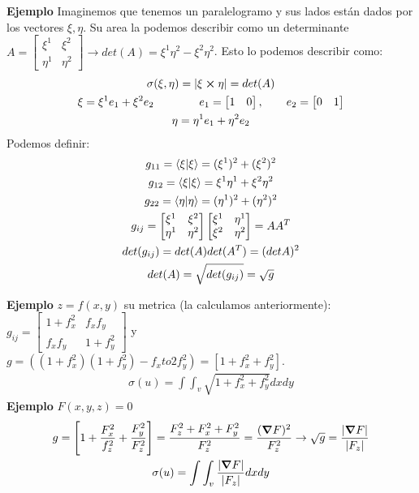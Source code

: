 \documentclass{article}
\begin{document}
\textbf{Ejemplo } Imaginemos que tenemos un paralelogramo y sus lados están dados por los vectores $ \xi, \eta  $. Su area la podemos describir como un determinante $ A = \begin{bmatrix}
    \xi ^ {1 } & \xi ^ {2 } \\
    \eta ^ {1 } & \eta ^ {2 }
\end{bmatrix} \rightarrow det(A) = \xi ^ {1 } \eta ^ {2 } - \xi ^ {2 } \eta ^ {2 }  $. Esto lo podemos describir como: 
\begin{gather}
  \sigma (\xi, \eta ) = \left|\xi \cross \eta \right| = det(A)\\
  \xi = \xi ^ {1 }e_1 + \xi ^ {2 }e_2 \qquad \qquad e_1 = \begin{bmatrix} 1  & 0  \end{bmatrix}, \qquad e_2 = \begin{bmatrix} 0  & 1  \end{bmatrix} \\ 
  \eta = \eta ^ {1} e_1 + \eta ^ {2 }e_2
\end{gather}
Podemos definir: 
\begin{gather}
  g _{11} = \bra{\xi }\ket{\xi } = (\xi ^ {1 }) ^ {2 } + (\xi ^ {2 })^2\\
  g _{12} = \bra{\xi }\ket{\xi } = \xi ^ {1 }\eta ^ {1 }+ \xi ^ {2 } \eta ^ {2 }\\
  g _{22} = \bra{\eta }\ket{\eta } =   (\eta ^ {1 }) ^ {2 } + (\eta ^ {2 })^2\\
  g _{ij }  = \begin{bmatrix}
      \xi ^ {1 } & \xi ^ { 2 } \\
      \eta ^ {1 } & \eta ^ {2 }
  \end{bmatrix} \begin{bmatrix}
      \xi ^ {1 } & \eta ^ {1 } \\
      \xi ^ {2 } & \eta ^ {2 }
  \end{bmatrix} = A A ^ {T}\\  
  det(g _{ij } ) = det(A) det(A ^ {T }) = (det A) ^ {2 }\\
  det(A) = \sqrt{det(g _{ij } )} = \sqrt{g } 
\end{gather}

\textbf{Ejemplo } $ z = f\left(x,y\right) $ su metrica (la calculamos anteriormente): $ g _{ij }  = \begin{bmatrix}
    1+ f_x ^ {2 } & f_x f_y  \\
    f_x f_y  & 1+ f_y ^ {2 }
\end{bmatrix}   $ y $ g = ((1+ f_x ^ {2 })(1+ f_y ^ {2 }) - f_x to
2 f_y ^ {2 }) = [1 + f_x ^ {2} + f_y ^ {2 }] $. 
\begin{gather}
  \sigma (u) = \int \int_{v }^{} \sqrt{1+ f_x ^ {2 }+ f_y ^ {2 }} dxdy
\end{gather}
\textbf{Ejemplo } $ F\left(x,y,z\right)=0  $
\begin{gather}
  g = \left[1 + \frac{F_x ^ {2 }}{f_z ^2} + \frac{F_y ^ {2 }}{F_z ^2}\right] = \frac{F_z ^2 + F_x ^2 + F_y ^2 }{F_z ^2} = \frac{(\grad F) ^2}{F_z ^2} \rightarrow \sqrt{g} = \frac{|\grad F |}{|F_z|}\\
  \sigma (u) = \int \int_{v }^{} \frac{|\grad F| }{|F_z| }dxdy
\end{gather}
\end{document}
